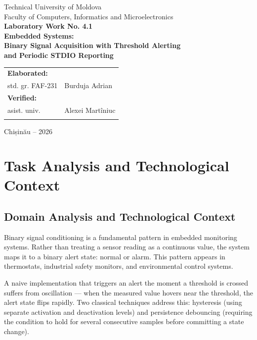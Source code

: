 \documentclass[12pt,a4paper]{article}
\begin{document}
\begin{titlepage}
\begin{center}
\vspace*{1cm}
{\Large Technical University of Moldova}\\[0.5cm]
{\Large Faculty of Computers, Informatics and Microelectronics}\\[2cm]
{\Huge\bfseries Laboratory Work No. 4.1}\\[1cm]
{\Large\bfseries Embedded Systems:\\
Binary Signal Acquisition with Threshold Alerting\\
and Periodic STDIO Reporting}\\[3.5cm]
\begin{flushright}
\begin{tabular}{ll}
\textbf{Elaborated:} & \\
std. gr. FAF-231 & Burduja Adrian \\[1cm]
\textbf{Verified:} & \\
asist. univ. & Alexei Martîniuc \\ & \\
\end{tabular}
\end{flushright}
\vfill
{\Large Chișinău -- 2026}
\end{center}
\end{titlepage}
\newpage

\section{Task Analysis and Technological Context}

\subsection{Domain Analysis and Technological Context}
Binary signal conditioning is a fundamental pattern in embedded monitoring systems.
Rather than treating a sensor reading as a continuous value, the system maps it to a
binary alert state: normal or alarm. This pattern appears in thermostats, industrial
safety monitors, and environmental control systems.

A naive implementation that triggers an alert the moment a threshold is crossed suffers
from oscillation — when the measured value hovers near the threshold, the alert state
flips rapidly. Two classical techniques address this: hysteresis (using separate activation
and deactivation levels) and persistence debouncing (requiring the condition to hold for
several consecutive samples before committing a state change).
\end{document}
